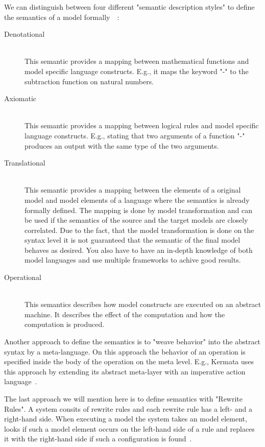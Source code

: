\documentclass{llncs}
\begin{document}
We can distinguish between four different "semantic description styles" to define the semantics of a model formally~\cite{jour:3}~\cite{jour:10}:
\begin{description}
\item [Denotational] \hfill \\
This semantic provides a mapping between mathematical functions and model specific language constructs. E.g., it maps the keyword "-" to the subtraction function on natural numbers.
\item [Axiomatic] \hfill \\
This semantic provides a mapping between logical rules and model specific language constructs. E.g., stating that two arguments of a function "-" produces an output with the same type of the two arguments.
\item [Translational] \hfill \\
This semantic provides a mapping between the elements of a original model and model elements of a language where the semantics is already formally defined. The mapping is done by model transformation and can be used if the semantics of the source and the target models are closely correlated. Due to the fact, that the model transformation is done on the syntax level it is not guaranteed that the semantic of the final model behaves as desired. You also have to have an in-depth knowledge of both model languages and use multiple frameworks to achive good results.
\item [Operational] \hfill \\
This semantics describes how model constructs are executed on an abstract machine. It describes the effect of the computation and how the computation is produced.
\end{description}

Another approach to define the semantics is to "weave behavior" into the abstract syntax by a meta-language. On this approach the behavior of an operation is specified inside the body of the operation on the meta level. E.g., Kermata uses this approach by extending its abstract meta-layer with an imperative action language~\cite{jour:4}.

The last approach we will mention here is to define semantics with "Rewrite Rules". A system consits of rewrite rules and each rewrite rule has a left- and a right-hand side. When executing a model the system takes an model element, looks if such a model element occurs on the left-hand side of a rule and replaces it with the right-hand side if such a configuration is found~\cite{jour:4}.
\end{document}
